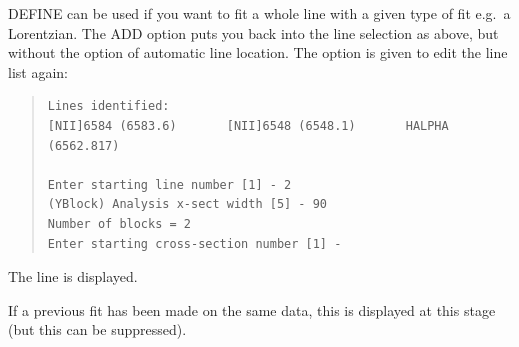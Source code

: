 \documentclass[11pt,twoside]{article}
\begin{document}
DEFINE can be used if you want to fit a whole line with a given type of
fit e.g.\ a  Lorentzian.  The ADD option puts you back into the line
selection as above, but without the option of automatic line location.
The option is given to edit the line list again:

\begin{quote}\begin{verbatim}
Lines identified:
[NII]6584 (6583.6)       [NII]6548 (6548.1)       HALPHA (6562.817)

Enter starting line number [1] - 2
(YBlock) Analysis x-sect width [5] - 90
Number of blocks = 2
Enter starting cross-section number [1] -
\end{verbatim}\end{quote}

The line is displayed.

If a previous fit has been made on the same data, this is displayed
at this stage (but this can be suppressed).
\end{document}
